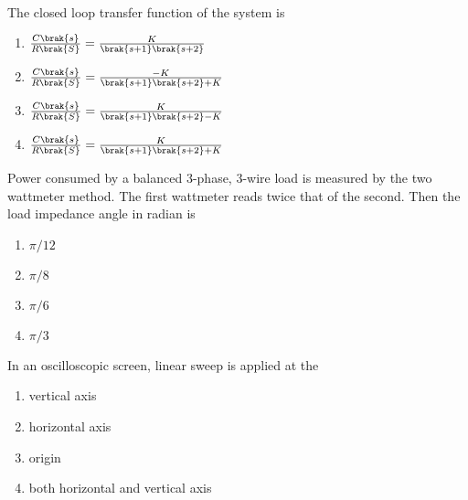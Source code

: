 \\
The closed loop transfer function of the system is
    \begin{enumerate}
        \item $\frac{C\brak{s}}{R\brak{S}}=\frac{K}{\brak{s+1}\brak{s+2}}$
        \item $\frac{C\brak{s}}{R\brak{S}}=\frac{-K}{\brak{s+1}\brak{s+2}+K}$
        \item $\frac{C\brak{s}}{R\brak{S}}=\frac{K}{\brak{s+1}\brak{s+2}-K}$
        \item $\frac{C\brak{s}}{R\brak{S}}=\frac{K}{\brak{s+1}\brak{s+2}+K}$
    \end{enumerate}
    \item Power consumed by a balanced 3-phase, 3-wire load is measured by the two wattmeter method. The first wattmeter reads twice that of the second. Then the load impedance angle in radian is
    \begin{enumerate}
        \item $\pi/12$
        \item $\pi/8$
        \item $\pi/6$
        \item $\pi/3$
    \end{enumerate}
    \item In an oscilloscopic screen, linear sweep is applied at the 
    \begin{enumerate}
        \item vertical axis 
        \item horizontal axis
        \item origin
        \item both horizontal and vertical axis
    \end{enumerate}
